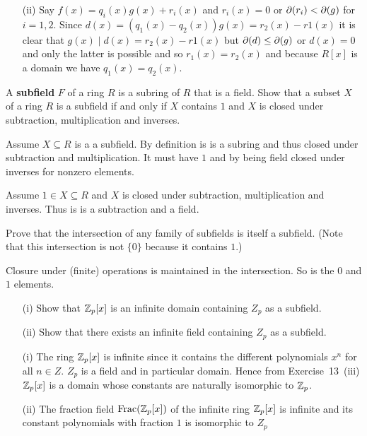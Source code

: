 \begin{myenumerate}
\begin{itemize}
 \item[(ii)]
    Say \(f(x)=q_i(x)g(x)+r_i(x)\) and
    \(r_i(x)=0\) or \(\partial(r_i)<\partial(g)\) for \(i=1,2\).
    Since \(d(x)=(q_1(x)-q_2(x))g(x)=r_2(x)-r1(x)\) it is clear
    that \(g(x)\mid d(x)=r_2(x)-r1(x)\) but \(\partial(d)\leq\partial(g)\)
    or \(d(x)=0\)
    and only the latter is possible and so \(r_1(x)=r_2(x)\)
    and because \(R[x]\) is a domain we have  \(q_1(x)=q_2(x)\).
\end{itemize}

\item
\begin{excopy}
A \textbf{subfield} $F$ of a ring $R$ is a subring of $R$ that is a field.
Show that a subset $X$ of a ring $R$ is a subfield if and only if $X$
contains $1$ and $X$ is closed under subtraction, multiplication and inverses.
\end{excopy}

Assume  \(X\subseteq R\) is a a subfield. By definition is is a subring
and thus closed under subtraction and multiplication.
It must have $1$ and by being field  closed under inverses for nonzero
elements.

Assume  \(1\in X\subseteq R\) and $X$
is closed under subtraction, multiplication and inverses.
Thus is is a subtraction and a field.

\item
\begin{excopy}
Prove that the intersection of any family of subfields is itself a subfield.
(Note that this intersection is not \(\{0\}\) because it contains $1$.)
\end{excopy}

Closure under (finite) operations is maintained in the intersection.
So is the $0$ and $1$ elements.

\item
\begin{excopy}
\begin{itemize}
 \item[(i)]
   Show that \(\mathbb{Z}_p[x]\) is an infinite domain containing \(Z_p\)
   as a subfield.
 \item[(ii)]
   Show that there exists an infinite field containing \(Z_p\) as a subfield.
\end{itemize}
\end{excopy}

\begin{itemize}
 \item[(i)]
   The ring \(\mathbb{Z}_p[x]\) is  infinite since it contains the different
   polynomials \(x^n\)  for all \(n\in Z\). \(Z_p\) is a field
   and in particular domain. Hence from Exercise~13~(iii)
   \(\mathbb{Z}_p[x]\) is a domain whose constants are naturally
   isomorphic to \(\mathbb{Z}_p\).
 \item[(ii)]
   The fraction field \(\mathop{\rm Frac}\nolimits(\mathbb{Z}_p[x])\) of the infinite ring \(\mathbb{Z}_p[x]\)
   is infinite and its constant polynomials with fraction $1$
   is isomorphic to \(Z_p\)
\end{itemize}



\end{myenumerate}
